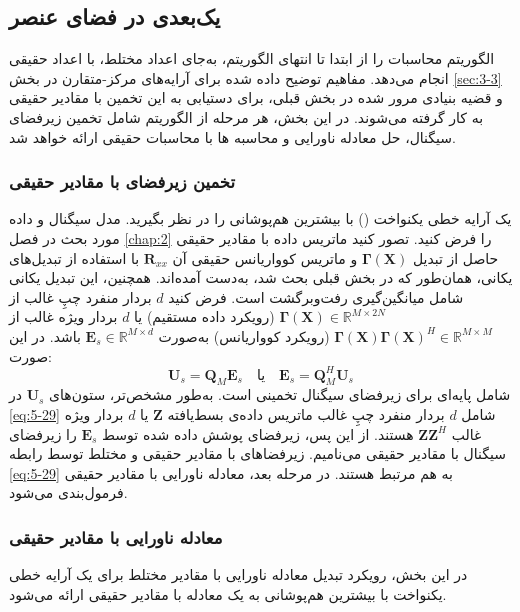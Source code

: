 \subsection{ یک‌بعدی در فضای عنصر}
\label{subsec:5-5-1}
الگوریتم  محاسبات را از ابتدا تا انتهای الگوریتم، به‌جای اعداد مختلط، با اعداد حقیقی انجام می‌دهد. مفاهیم توضیح داده شده برای آرایه‌های مرکز-متقارن در بخش \ref{sec:3-3} و قضیه بنیادی مرور شده در بخش قبلی، برای دستیابی به این تخمین با مقادیر حقیقی به کار گرفته می‌شوند. در این بخش، هر مرحله از الگوریتم شامل تخمین زیرفضای سیگنال، حل معادله ناورایی و محاسبه ها با محاسبات حقیقی ارائه خواهد شد.

\subsubsection{تخمین زیرفضای با مقادیر حقیقی}
\label{subsubsec:5-5-1-1}
یک آرایه خطی یکنواخت () با بیشترین هم‌پوشانی را در نظر بگیرید. مدل سیگنال و داده مورد بحث در فصل \ref{chap:2} را فرض کنید. تصور کنید ماتریس داده با مقادیر حقیقی حاصل از تبدیل $\bm{\Gamma}(\bm{X})$ و ماتریس کوواریانس حقیقی آن $\bm{R}_{xx}$ با استفاده از تبدیل‌های یکانی، همان‌طور که در بخش قبلی بحث شد، به‌دست آمده‌اند. همچنین، این تبدیل یکانی شامل میانگین‌گیری رفت‌وبرگشت است. فرض کنید $d$ بردار منفرد چپِ غالب از $\bm{\Gamma}(\bm{X}) \in \mathbb{R}^{M \times 2N}$ (رویکرد داده مستقیم) یا $d$ بردار ویژه غالب از $\bm{\Gamma}(\bm{X})\bm{\Gamma}(\bm{X})^H \in \mathbb{R}^{M \times M}$ (رویکرد کوواریانس) به‌صورت $\bm{E}_s \in \mathbb{R}^{M \times d}$ باشد. در این صورت:
\begin{equation}
	\bm{U}_s = \bm{Q}_M \bm{E}_s \quad \text{یا} \quad \bm{E}_s = \bm{Q}_M^H \bm{U}_s
	\label{eq:5-29}
\end{equation}
شامل پایه‌ای برای زیرفضای سیگنال تخمینی است. به‌طور مشخص‌تر، ستون‌های $\bm{U}_s$ در \eqref{eq:5-29} شامل $d$ بردار منفرد چپِ غالب ماتریس داده‌ی بسط‌یافته $\bm{Z}$ یا $d$ بردار ویژه غالب $\bm{ZZ}^H$ هستند. از این پس، زیرفضای پوشش داده شده توسط $\bm{E}_s$ را زیرفضای سیگنال با مقادیر حقیقی می‌نامیم. زیرفضاهای با مقادیر حقیقی و مختلط توسط رابطه \eqref{eq:5-29} به هم مرتبط هستند. در مرحله بعد، معادله ناورایی با مقادیر حقیقی فرمول‌بندی می‌شود.

\subsubsection{معادله ناورایی با مقادیر حقیقی}
\label{subsubsec:5-5-1-2}
در این بخش، رویکرد تبدیل معادله ناورایی با مقادیر مختلط برای یک آرایه خطی یکنواخت با بیشترین هم‌پوشانی به یک معادله با مقادیر حقیقی ارائه می‌شود.

